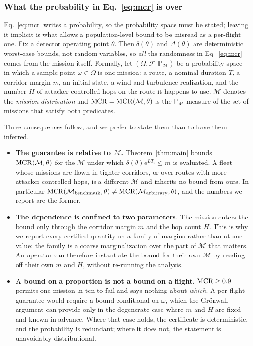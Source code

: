 \subsubsection*{What the probability in Eq.~\eqref{eq:mcr} is over}
\label{sec:probspace}
Eq.~\eqref{eq:mcr} writes a probability, so the probability space must be
stated; leaving it implicit is what allows a population-level bound to be
misread as a per-flight one. Fix a detector operating point $\theta$. Then
$\delta(\theta)$ and $\Delta(\theta)$ are deterministic worst-case bounds, not
random variables, so \emph{all} the randomness in Eq.~\eqref{eq:mcr} comes
from the mission itself. Formally, let $(\Omega,\mathcal{F},\mathbb{P}_{\mathcal{M}})$
be a probability space in which a sample point $\omega\in\Omega$ is one mission:
a route, a nominal duration $T$, a corridor margin $m$, an initial state, a wind and turbulence realization, and the number $H$ of attacker-controlled hops on
the route it happens to use. $\mathcal{M}$ denotes the \emph{mission
distribution} and $\mathrm{MCR}=\mathrm{MCR}(\mathcal{M},\theta)$ is the
$\mathbb{P}_{\mathcal{M}}$-measure of the set of missions that satisfy both predicates.

Three consequences follow, and we prefer to state them than to have them
inferred.

\begin{itemize}
\item \textbf{The guarantee is relative to $\mathcal{M}$.} Theorem~\ref{thm:main}
bounds $\mathrm{MCR}(\mathcal{M},\theta)$ for the $\mathcal{M}$ under which
$\delta(\theta)e^{LT_c}\le m$ is evaluated. A fleet whose missions are flown in
tighter corridors, or over routes with more attacker-controlled hops, is a
different $\mathcal{M}$ and inherits no bound from ours. In particular
$\mathrm{MCR}(\mathcal{M}_{\text{benchmark}},\theta)\neq\mathrm{MCR}(\mathcal{M}_{\text{arbitrary}},\theta)$,
and the numbers we report are the former.
\item \textbf{The dependence is confined to two parameters.} The mission enters
the bound only through the corridor margin $m$ and the hop count $H$. This is why we report every certified quantity on a family of margins rather than at
one value: the family is a coarse marginalization over the part of $\mathcal{M}$
that matters. An operator can therefore instantiate the bound for their own
$\mathcal{M}$ by reading off their own $m$ and $H$, without re-running the
analysis.
\item \textbf{A bound on a proportion is not a bound on a flight.} $\mathrm{MCR}\ge0.9$
permits one mission in ten to fail and says nothing about \emph{which}. A
per-flight guarantee would require a bound conditional on $\omega$, which the
Gr\"onwall argument can provide only in the degenerate case where $m$ and $H$ are
fixed and known in advance. Where that case holds, the certificate is deterministic, and the probability is redundant; where it does not, the statement
is unavoidably distributional.
\end{itemize}

